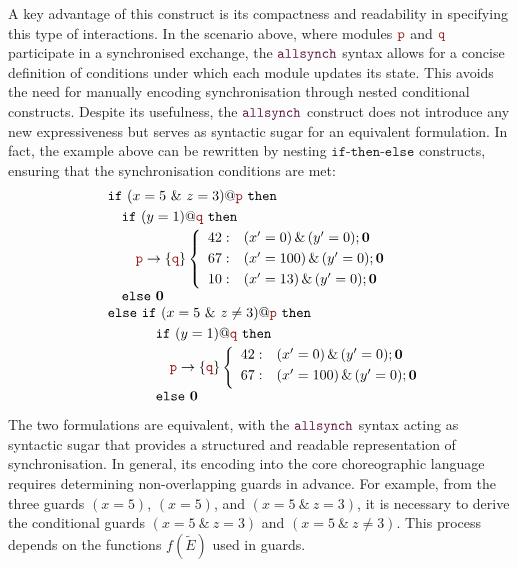 \begin{itemize}
  
  A key advantage of this construct is its compactness and readability
  in specifying this type of interactions. In the scenario above,
  where modules $\role{p}$ and $\role{q}$ participate in a
  synchronised exchange, the $\allsynchName$ syntax allows for a
  concise definition of conditions under which each module updates its
  state. This avoids the need for manually encoding synchronisation
  through nested conditional constructs.
  Despite its usefulness, the $\allsynchName$ construct does not
  introduce any new expressiveness but serves as syntactic sugar for
  an equivalent formulation.  In fact, the example above can be
  rewritten by nesting $\mathtt{if\text{-}then\text{-}else}$
  constructs, ensuring that the synchronisation conditions are met:
  \begin{displaymath}
    \begin{array}{ll}
      & \mathtt{if}\ (x=5\ \&\ z=3)@\nr\ \mathtt{then}\\[1mm]
      & \quad \mathtt{if}\ (y=1)@\nrr\ \mathtt{then}\\[1mm]
      & \quad \quad \interactBase{\nr}{\nrr}
        \left\{
        \begin{array}{rlll}
          42 : &  (x'=0)\,\&\,(y'=0);\CEnd \\[1mm]
          67 : &  (x'=100)\,\&\,(y'=0);\CEnd \\[1mm]
          10 : &  (x'=13)\,\&\,(y'=0);\CEnd
        \end{array}
        \right.
      \\
      & \quad \mathtt{else}\ \CEnd \\
      & \mathtt{else}\ \mathtt{if}\ (x=5\ \&\ z\neq3)@\nr\
        \mathtt{then}\\[1mm]
      & \phantom{\mathtt{else}\ }\quad
        \mathtt{if}\ (y=1)@\nrr\ \mathtt{then}\\[1mm]
      & \phantom{\mathtt{else}\ \quad}\quad
        \interactBase{\nr}{\nrr}
        \left\{
        \begin{array}{rlll}
          42 : &  (x'=0)\,\&\,(y'=0);\CEnd \\[1mm]
          67 : &  (x'=100)\,\&\,(y'=0);\CEnd \\[1mm]
        \end{array}
        \right.
      \\
      & \phantom{\mathtt{else}\ }\quad\mathtt{else}\ \CEnd
    \end{array}
  \end{displaymath}
  The two formulations are equivalent, with the $\allsynchName$ syntax
  acting as syntactic sugar that provides a structured and readable
  representation of synchronisation. In general, its encoding into the
  core choreographic language requires determining non-overlapping
  guards in advance. For example, from the three guards $(x=5)$,
  $(x=5)$, and $(x=5\ \&\ z=3)$, it is necessary to derive the
  conditional guards $(x=5\ \&\ z=3)$ and $(x=5\ \&\ z\neq 3)$. This
  process depends on the functions $f(\tilde E)$ used in guards.


\end{itemize}
